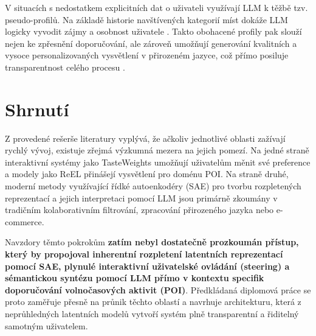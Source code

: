V situacích s nedostatkem explicitních dat o uživateli využívají LLM k těžbě tzv. pseudo-profilů. Na základě historie navštívených kategorií míst dokáže LLM logicky vyvodit zájmy a osobnost uživatele \cite{Zeng2025}. Takto obohacené profily pak slouží nejen ke zpřesnění doporučování, ale zároveň umožňují generování kvalitních a vysoce personalizovaných vysvětlení v přirozeném jazyce, což přímo posiluje transparentnost celého procesu \cite{Hasan2025}.

\section{Shrnutí}
\label{sec:related_summary}

Z provedené rešerše literatury vyplývá, že ačkoliv jednotlivé oblasti zažívají rychlý vývoj, existuje zřejmá výzkumná mezera na jejich pomezí. Na jedné straně interaktivní systémy jako TasteWeights umožňují uživatelům měnit své preference a modely jako ReEL přinášejí vysvětlení pro doménu POI. Na straně druhé, moderní metody využívající řídké autoenkodéry (SAE) pro tvorbu rozpletených reprezentací a jejich interpretaci pomocí LLM jsou primárně zkoumány v tradičním kolaborativním filtrování, zpracování přirozeného jazyka nebo e-commerce.

Navzdory těmto pokrokům \textbf{zatím nebyl dostatečně prozkoumán přístup, který by propojoval inherentní rozpletení latentních reprezentací pomocí SAE, plynulé interaktivní uživatelské ovládání (steering) a sémantickou syntézu pomocí LLM přímo v kontextu specifik doporučování volnočasových aktivit (POI)}. Předkládaná diplomová práce se proto zaměřuje přesně na průnik těchto oblastí a navrhuje architekturu, která z neprůhledných latentních modelů vytvoří systém plně transparentní a řiditelný samotným uživatelem.